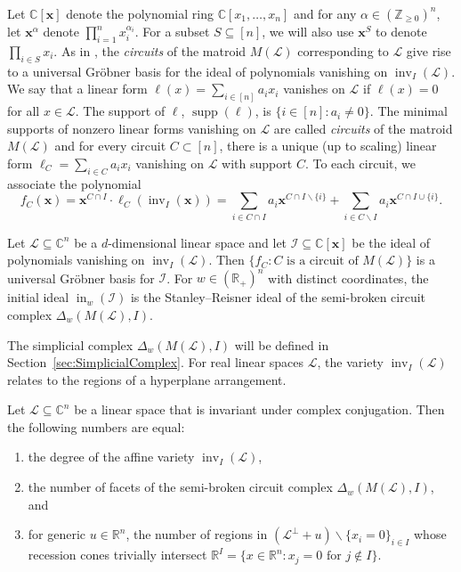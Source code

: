 \documentclass[ALCO,ThmDefs,Unicode,epreuves]{cedram}
\newcommand{\Z}{\mathbb{Z}}
\newcommand{\R}{\mathbb{R}}
\newcommand{\Cbb}{\mathbb{C}}
\newcommand{\I}{\mathcal{I}}
\newcommand{\cL}{\mathcal{L}}
\newcommand{\x}{\mathbf{x}}
\DeclareMathOperator{\In}{in}
\DeclareMathOperator{\inv}{inv}
\DeclareMathOperator{\supp}{supp}
\begin{document}
Let $\Cbb[\x]$ denote the polynomial ring $\Cbb[x_1, \ldots ,x_n]$ and for any $\alpha \in (\Z_{\geq 0})^n$, let 
$\x^{\alpha}$ denote $\prod_{i=1}^n x_i^{\alpha_i}$. For a subset $S\subseteq[n]$, we will also use $\x^S$ to denote $\prod_{i\in S}x_i$. 
As in \cite{PS}, the \emph{circuits} of the matroid $M(\cL)$ corresponding to $\cL$ give rise to a universal Gr\"obner basis for the 
ideal of polynomials vanishing on $\inv_I(\cL)$. 
We say that a linear form $\ell(x)= \sum_{i\in [n]} a_i x_i$ vanishes on $\cL$ if $\ell(x) = 0$ for all $x\in \cL$. 
The support of $\ell$, $\supp(\ell)$, is $\{i\in [n] : a_i\neq 0\}$. The minimal supports of nonzero linear forms vanishing on $\cL$
are called \emph{circuits} of the matroid $M(\cL)$ and for every circuit $C\subset [n]$, there is a unique (up to scaling) 
linear form $\ell_C= \sum_{i\in C} a_i x_i$ vanishing on $\cL$ with support $C$. To each circuit, we associate the polynomial 
\begin{equation}\label{eq:fC_def}
f_C(\x) = \x^{C\cap I} \cdot \ell_C(\inv_I(\x)) = \sum_{i\in C\cap I} a_i \x^{C\cap I\backslash\{ i\}} + \sum_{i\in C\backslash I } a_i \x^{C\cap I \cup\{ i\}}.
\end{equation}


\begin{theo}\label{thm:main}
Let $\cL\subseteq \Cbb^n$ be a $d$-dimensional linear space and 
let $\I \subseteq \Cbb[\x]$ be the ideal of polynomials vanishing on $\inv_I(\cL)$. 
Then $\{f_C : C \text{ is a circuit of }M(\cL)\}$ is a universal Gr\"obner basis for $\I$. 
For $w\in (\R_+)^n$ with distinct coordinates, the initial ideal $\In_w(\I)$ is the Stanley--Reisner 
ideal of the semi-broken circuit complex $\Delta_w(M(\cL), I)$. 
\end{theo}

The simplicial complex $\Delta_w(M(\cL), I)$ will be defined in Section~\ref{sec:SimplicialComplex}.
For real linear spaces $\cL$, the variety $\inv_I(\cL)$ relates to the regions of a hyperplane arrangement. 


\begin{theo}\label{thm:real}
Let $\cL\subseteq \Cbb^n$ be a linear space that is invariant under complex conjugation. Then the following numbers are equal:
\begin{enumerate}
\item\label{theo1.2_1} the degree of the affine variety $\inv_I(\cL)$,
\item\label{theo1.2_2} the number of facets of the semi-broken circuit complex $\Delta_w(M(\cL), I)$, and 
\item\label{theo1.2_3} for generic $u\in \R^n$, the number of
regions in $(\cL^{\perp}+u)\backslash \{x_i = 0\}_{i\in I}$ 
whose recession cones trivially intersect $\R^I = \{x \in \R^n : x_j = 0 \text{ for } j\not\in I\}$. 
\end{enumerate}
\end{theo}
\end{document}
